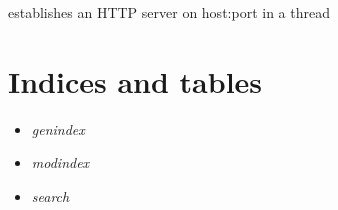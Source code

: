 \documentclass[letterpaper,10pt,english]{sphinxmanual}
\begin{document}

\begin{fulllineitems}
\label{threaded_http:threaded_http.threaded_http}
establishes an HTTP server on host:port in a thread

\end{fulllineitems}



\chapter{Indices and tables}
\label{index:indices-and-tables}\begin{itemize}
\item {} 
\emph{genindex}

\item {} 
\emph{modindex}

\item {} 
\emph{search}

\end{itemize}
\end{document}
